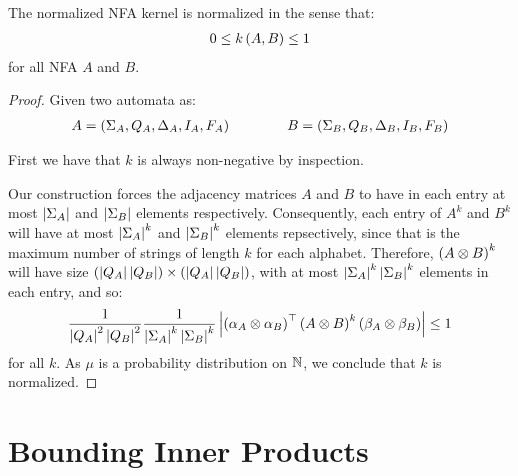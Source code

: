 \documentclass[12pt]{article}
\begin{document}
\begin{theorem}
  The normalized NFA kernel is normalized in the sense that:
  \begin{align*}
    0 \leq k\left(A, B\right) \leq 1
  \end{align*}
  for all NFA \(A\) and \(B\).
\end{theorem}
\begin{proof}
  Given two automata as:
  \begin{align*}
    A = \left(\Sigma_A, Q_A, \Delta_A, I_A, F_A\right)
    \qquad \qquad
    B = \left(\Sigma_B, Q_B, \Delta_B, I_B, F_B\right)
  \end{align*}

  First we have that \(k\) is always non-negative by inspection.

  Our construction forces the adjacency matrices \(A\) and \(B\)
  to have in each entry at most
  \(\left\lvert\Sigma_A\right\rvert\) and \(\left\lvert\Sigma_B\right\rvert\) elements respectively.
  Consequently, each entry of \(A^k\) and \(B^k\)
  will have at most \(\left\lvert\Sigma_A\right\rvert^k\) and \(\left\lvert\Sigma_B\right\rvert^k\)
  elements repsectively, since that is the maximum number of strings of
  length \(k\) for each alphabet.
  Therefore, \(\left(A \otimes B\right)^k\)
  will have size
  \(\left(\left\lvert Q_A\right\rvert \left\lvert Q_B\right\rvert\right) \times \left(\left\lvert Q_A\right\rvert \left\lvert Q_B\right\rvert\right)\),
  with at most \(\left\lvert\Sigma_A\right\rvert^k \left\lvert\Sigma_B\right\rvert^k\) elements
  in each entry, and so:
  \begin{align*}
    \frac{1}{\left\lvert Q_A\right\rvert^2 \left\lvert Q_B\right\rvert^2}
    \frac{1}{\left\lvert\Sigma_A\right\rvert^k \left\lvert\Sigma_B\right\rvert^k}
    \left\lvert\left(\alpha_A \otimes \alpha_B\right)^\top \left(A \otimes B\right)^k \left(\beta_A \otimes \beta_B\right)\right\rvert
      \leq 1
  \end{align*}
  for all \(k\).
  As \(\mu\) is a probability distribution on \(\mathbb{N}\),
  we conclude that \(k\) is normalized.

\end{proof}




\section{Bounding Inner Products}




\printbibliography
\end{document}
